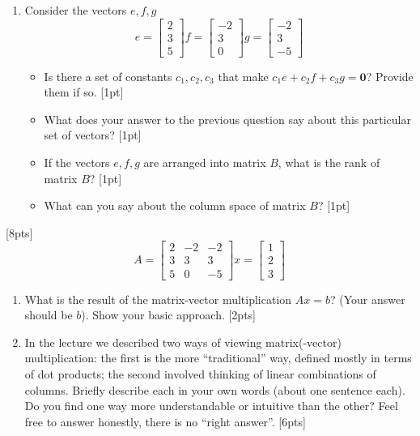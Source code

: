 \documentclass[11pt]{article}
\begin{document}
\begin{enumerate}[label=\alph*.]
  \item Consider the vectors $e, f, g$
  \[
    e = \begin{bmatrix}2 \\ 3 \\ 5\end{bmatrix}
    f = \begin{bmatrix}-2 \\ 3 \\ 0\end{bmatrix}
    g = \begin{bmatrix}-2 \\ 3 \\ -5\end{bmatrix}
  \]
  \begin{itemize}
    \setlength\itemsep{2em}
    \item Is there a set of constants ${c_1, c_2, c_3}$ that make $c_1e + c_2f + c_3g = \mathbf{0}$? Provide them if so. [1pt]
    \item What does your answer to the previous question say about this particular set of vectors? [1pt]
    \item If the vectors $e, f, g$ are arranged into matrix $B$, what is the rank of matrix $B$? [1pt]
    \item What can you say about the column space of matrix $B$? [1pt]
  \end{itemize}
\end{enumerate}

\vspace{2em}
 [8pts]
\[
  A = \begin{bmatrix}
    2 & -2 & -2 \\
    3 & 3 & 3 \\
    5 & 0 & -5
  \end{bmatrix}
  x = \begin{bmatrix}1 \\ 2 \\ 3\end{bmatrix}
\]

\begin{enumerate}[label=\alph*.]
  \setlength\itemsep{2em}
  \item What is the result of the matrix-vector multiplication $Ax = b$? (Your answer should be $b$). Show your basic approach. [2pts]
  \item In the lecture we described two ways of viewing matrix(-vector) multiplication: the first is the more ``traditional'' way, defined mostly in terms of dot products; the second involved thinking of linear combinations of columns. Briefly describe each in your own words (about one sentence each). Do you find one way more understandable or intuitive than the other? Feel free to answer honestly, there is no ``right answer''. [6pts]
\end{enumerate}
\end{document}

